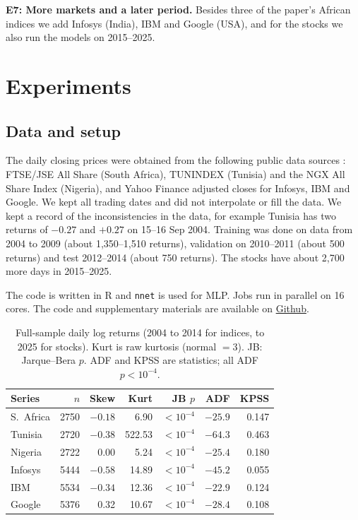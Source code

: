 \documentclass{article}
\begin{document}
\textbf{E7: More markets and a later period.} Besides three of the paper's African indices we add Infosys (India), IBM and Google (USA), and for the stocks we also run the models on 2015--2025.

\section{Experiments}
\label{sec:exp}

\subsection{Data and setup}

The daily closing prices were obtained from the following public data sources : FTSE/JSE All Share (South Africa), TUNINDEX (Tunisia) and the NGX All Share Index (Nigeria), and Yahoo Finance adjusted closes for Infosys, IBM and Google. We kept all trading dates and did not interpolate or fill the data. We kept a record of the inconsistencies in the data, for example Tunisia has two returns of $-0.27$ and $+0.27$ on 15--16 Sep 2004. Training was done on data from 2004 to 2009 (about 1,350--1,510 returns), validation on 2010--2011 (about 500 returns) and test 2012--2014 (about 750 returns). The stocks have about 2,700 more days in 2015--2025.

The code is written in R and \texttt{nnet} is used for MLP. Jobs run in parallel on 16 cores. The code and supplementary materials are available on \href{https://github.com/pushpendras0026/Volatility-forecasting-with-the-wavelet-transform}{Github}.

\begin{table}[t]
\caption{Full-sample daily log returns (2004 to 2014 for indices, to 2025 for stocks). Kurt is raw kurtosis (normal $=3$). JB: Jarque--Bera $p$. ADF and KPSS are statistics; all ADF $p<10^{-4}$.}
\label{tab:data}
\centering\small
\setlength{\tabcolsep}{3.5pt}
\begin{tabular}{lrrrrrr}
\toprule
Series & $n$ & Skew & Kurt & JB $p$ & ADF & KPSS \\
\midrule
S.\ Africa & 2750 & $-0.18$ & 6.90 & $<10^{-4}$ & $-25.9$ & 0.147 \\
Tunisia & 2720 & $-0.38$ & 522.53 & $<10^{-4}$ & $-64.3$ & 0.463 \\
Nigeria & 2722 & 0.00 & 5.24 & $<10^{-4}$ & $-25.4$ & 0.180 \\
Infosys & 5444 & $-0.58$ & 14.89 & $<10^{-4}$ & $-45.2$ & 0.055 \\
IBM & 5534 & $-0.34$ & 12.36 & $<10^{-4}$ & $-22.9$ & 0.124 \\
Google & 5376 & 0.32 & 10.67 & $<10^{-4}$ & $-28.4$ & 0.108 \\
\bottomrule
\end{tabular}
\end{table}
\end{document}
